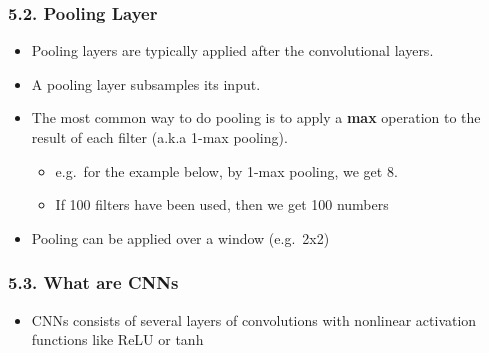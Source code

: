 \documentclass[11pt]{article}
\providecommand{\tightlist}{%
      \setlength{\itemsep}{0pt}\setlength{\parskip}{0pt}}
\begin{document}
    \hypertarget{pooling-layer}{%
\subsubsection{5.2. Pooling Layer}\label{pooling-layer}}

\begin{itemize}
\tightlist
\item
  Pooling layers are typically applied after the convolutional layers.
\item
  A pooling layer subsamples its input.
\item
  The most common way to do pooling is to apply a \textbf{max} operation
  to the result of each filter (a.k.a 1-max pooling).

  \begin{itemize}
  \tightlist
  \item
    e.g.~for the example below, by 1-max pooling, we get 8.
  \item
    If 100 filters have been used, then we get 100 numbers
  \end{itemize}
\item
  Pooling can be applied over a window (e.g.~2x2) 
\end{itemize}

    \hypertarget{what-are-cnns}{%
\subsubsection{5.3. What are CNNs}\label{what-are-cnns}}

\begin{itemize}
\tightlist
\item
  CNNs consists of several layers of convolutions with nonlinear
  activation functions like ReLU or tanh
\end{itemize}
\end{document}
